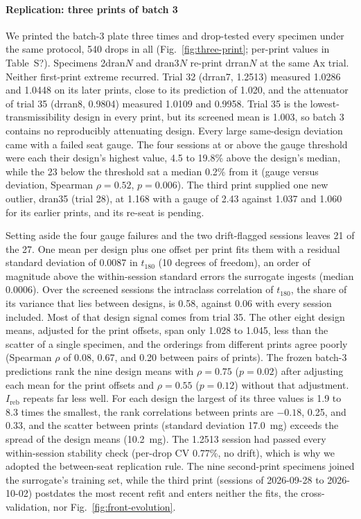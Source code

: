 \documentclass[11pt]{article}
\providecommand{\siref}[1]{S?}
\begin{document}
\paragraph{Replication: three prints of batch 3} We printed the batch-3
plate three times and drop-tested every specimen under the same protocol,
540 drops in all (Fig.~\ref{fig:three-print}; per-print values in
Table~\siref{tab:si-round3-repeatability}). Specimens 2dran$N$ and
dran3$N$ re-print drran$N$ at the same Ax trial. Neither first-print
extreme recurred. Trial 32 (drran7, 1.2513) measured 1.0286 and 1.0448
on its later prints, close to its prediction of 1.020, and the
attenuator of trial 35 (drran8, 0.9804) measured 1.0109 and 0.9958.
Trial 35 is the lowest-transmissibility design in every print, but its
screened mean is 1.003, so batch 3 contains no reproducibly attenuating
design. Every large same-design deviation came with a failed seat gauge.
The four sessions at or above the gauge threshold were each their design's highest
value, 4.5 to 19.8\% above the design's median, while the 23 below the
threshold sat a median 0.2\% from it (gauge versus deviation, Spearman
$\rho = 0.52$, $p = 0.006$). The third print supplied one new outlier,
dran35 (trial 28), at 1.168 with a gauge of 2.43 against 1.037 and 1.060
for its earlier prints, and its re-seat is pending.

Setting aside the four gauge failures and the two drift-flagged
sessions leaves 21 of the 27. One mean per design plus one offset per
print fits them with a residual standard deviation of 0.0087 in
$t_{180}$ (10 degrees of freedom), an order of magnitude above the
within-session standard errors the surrogate ingests (median 0.0006).
Over the screened sessions the intraclass correlation of $t_{180}$, the
share of its variance that lies between designs, is 0.58, against 0.06
with every session included. Most of that design signal comes from trial
35. The other eight design means, adjusted for the print offsets, span
only 1.028 to 1.045, less than the scatter of a single specimen, and the
orderings from different prints
agree poorly (Spearman $\rho$ of 0.08, 0.67, and 0.20 between pairs of
prints). The frozen batch-3 predictions rank the nine design means with
$\rho = 0.75$ ($p = 0.02$) after adjusting each mean for the print
offsets and $\rho = 0.55$ ($p = 0.12$) without that adjustment.
$I_{\mathrm{reb}}$ repeats far less well. For each design the largest of
its three values is 1.9 to 8.3 times the smallest, the rank correlations
between prints are $-0.18$, 0.25, and 0.33, and the scatter between
prints (standard deviation \SI{17.0}{mg}) exceeds the spread of the
design means (\SI{10.2}{mg}). The 1.2513 session had passed every
within-session stability check (per-drop CV 0.77\%, no drift), which is
why we adopted the between-seat replication rule. The nine second-print
specimens joined the surrogate's training set, while the third print
(sessions of 2026-09-28 to 2026-10-02) postdates the most recent refit
and enters neither the fits, the cross-validation, nor
Fig.~\ref{fig:front-evolution}.
\end{document}
